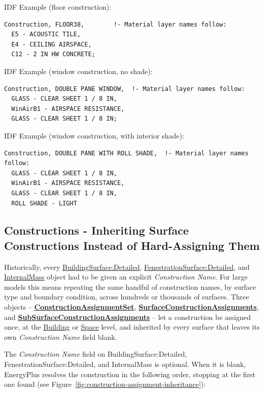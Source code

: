 IDF Example (floor construction):

\begin{lstlisting}
Construction, FLOOR38,        !- Material layer names follow:
  E5 - ACOUSTIC TILE,
  E4 - CEILING AIRSPACE,
  C12 - 2 IN HW CONCRETE;
\end{lstlisting}

IDF Example (window construction, no shade):

\begin{lstlisting}
Construction, DOUBLE PANE WINDOW,  !- Material layer names follow:
  GLASS - CLEAR SHEET 1 / 8 IN,
  WinAirB1 - AIRSPACE RESISTANCE,
  GLASS - CLEAR SHEET 1 / 8 IN;
\end{lstlisting}

IDF Example (window construction, with interior shade):

\begin{lstlisting}
Construction, DOUBLE PANE WITH ROLL SHADE,  !- Material layer names follow:
  GLASS - CLEAR SHEET 1 / 8 IN,
  WinAirB1 - AIRSPACE RESISTANCE,
  GLASS - CLEAR SHEET 1 / 8 IN,
  ROLL SHADE - LIGHT
\end{lstlisting}

\subsection{Constructions - Inheriting Surface Constructions Instead of Hard-Assigning Them}\label{constructions---inheriting-surface-constructions-instead-of-hard-assigning-them}

Historically, every \hyperref[buildingsurfacedetailed]{BuildingSurface:Detailed}, \hyperref[fenestrationsurfacedetailed]{FenestrationSurface:Detailed}, and \hyperref[internalmass]{InternalMass} object had to be given an explicit \emph{Construction Name}. For large models this means repeating the same handful of construction names, by surface type and boundary condition, across hundreds or thousands of surfaces. Three objects -- \textbf{\hyperref[constructionassignmentset]{ConstructionAssignmentSet}}, \textbf{\hyperref[surfaceconstructionassignments]{SurfaceConstructionAssignments}}, and \textbf{\hyperref[subsurfaceconstructionassignments]{SubSurfaceConstructionAssignments}} -- let a construction be assigned once, at the \hyperref[building]{Building} or \hyperref[space]{Space} level, and inherited by every surface that leaves its own \emph{Construction Name} field blank.

The \emph{Construction Name} field on BuildingSurface:Detailed, FenestrationSurface:Detailed, and InternalMass is optional. When it is blank, EnergyPlus resolves the construction in the following order, stopping at the first one found (see Figure~\ref{fig:construction-assignment-inheritance}):

